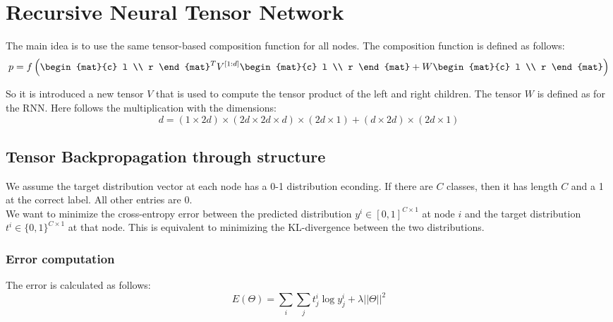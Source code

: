 \section{Recursive Neural Tensor Network}

The main idea is to use the same tensor-based composition function for all
nodes. The composition function is defined as follows:
\begin{equation}
	p = f\left( 
	\begin{mat}{c}
		l \\
		r 
	\end{mat}^T
	V^{[1:d]}
	\begin{mat}{c}
		l \\
		r 
	\end{mat}
	+ W
	\begin{mat}{c}
		l \\
		r 
	\end{mat}
	\right)
\end{equation}

So it is introduced a new tensor $V$ that is used to compute the tensor product
of the left and right children. The tensor $W$ is defined as for the RNN. Here
follows the multiplication with the dimensions:
\begin{equation}
d = (1 \times 2d) \times (2d \times 2d \times d) \times (2d \times 1) + (d
\times 2d) \times (2d \times 1)
\end{equation}

\subsection{Tensor Backpropagation through structure}

We assume the target distribution vector at each node has a 0-1 distribution
econding. If there are $C$ classes, then it has length $C$ and a 1 at the
correct label. All other entries are 0.\\
We want to minimize the cross-entropy error between the predicted distribution
$y^i \in [0, 1]^{C \times 1}$ at node $i$ and the target distribution $t^i \in
\{0, 1\}^{C \times 1}$ at that node. This is equivalent to minimizing 
the KL-divergence between the two distributions. 

\subsubsection{Error computation}

The error is calculated as follows:
\begin{equation}
	E(\Theta) = \sum_i \sum_j t_j^i \log y_j^i + \lambda ||\Theta||^2
\end{equation}

